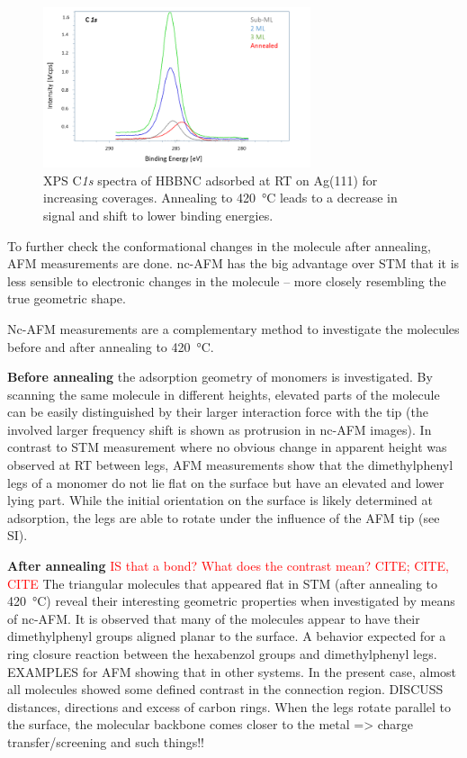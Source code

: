 \begin{figure}[] \centering
	\includegraphics[width=0.7\textwidth]{./images/hbbnc-xps1}
	\caption{XPS C\textit{1s} spectra of HBBNC adsorbed at RT on Ag(111) for increasing coverages. Annealing to \SI{420}{\celsius} leads to a decrease in signal and shift to lower binding energies.}
	\label{}
\end{figure}

To further check the conformational changes in the molecule after annealing, AFM measurements are done. nc-AFM has the big advantage over STM that it is less sensible to electronic changes in the molecule – more closely resembling the true geometric shape.

Nc-AFM measurements are a complementary method to investigate the molecules before and after annealing to \SI{420}{\celsius}. 

\textbf{Before annealing} the adsorption geometry of monomers is investigated. By scanning the same molecule in different heights, elevated parts of the molecule can be easily distinguished by their larger interaction force with the tip (the involved larger frequency shift is shown as protrusion in nc-AFM images). In contrast to STM measurement where no obvious change in apparent height was observed at RT between legs, AFM measurements show that the dimethylphenyl legs of a monomer do not lie flat on the surface but have an elevated and lower lying part. While the initial orientation on the surface is likely determined at adsorption, the legs are able to rotate under the influence of the AFM tip (see SI).

\textbf{After annealing} \textcolor{red}{IS that a bond? What does the contrast mean? CITE; CITE, CITE}
The triangular molecules that appeared flat in STM (after annealing to \SI{420}{\celsius}) reveal their interesting geometric properties when investigated by means of nc-AFM. It is observed that many of the molecules appear to have their dimethylphenyl groups aligned planar to the surface. A behavior expected for a ring closure reaction between the hexabenzol groups and dimethylphenyl legs. EXAMPLES for AFM showing that in other systems. In the present case, almost all molecules showed some defined contrast in the connection region. DISCUSS distances, directions and excess of carbon rings.
When the legs rotate parallel to the surface, the molecular backbone comes closer to the metal => charge transfer/screening and such things!!

